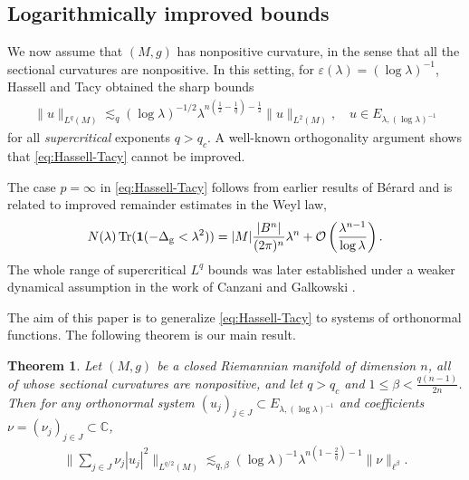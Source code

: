 \documentclass[12pt,reqno,a4paper]{amsart}
\let\coloneq\relax
\newcommand{\coloneq}{\coloneqq}
\newcommand{\C}{{\mathbb C}}
\newcommand{\g}{{\rm g}}
\newtheorem{theorem}{Theorem}[section]
\begin{document}
\subsection{Logarithmically improved bounds}
We now assume that $(M,g)$ has nonpositive curvature, in the sense that all the sectional curvatures are nonpositive. In this setting, for $\varepsilon(\lambda)=(\log \lambda)^{-1}$, Hassell and Tacy \cite{HassellTacy-2015} obtained the sharp bounds 
\begin{align}\label{eq:Hassell-Tacy}
  \|u\|_{L^{q}(M)} \lesssim_q (\log \lambda)^{-1/2} \lambda^{n(\frac{1}{2}-\frac{1}{q})-\frac{1}{2}}\|u\|_{L^2(M)},\quad u\in E_{\lambda, (\log \lambda)^{-1}}
\end{align}
for all \emph{supercritical} exponents $q>q_c$.  A well-known orthogonality argument shows that \eqref{eq:Hassell-Tacy} cannot be improved.

The case $p=\infty$ in \eqref{eq:Hassell-Tacy} follows from earlier results of B\'erard \cite{Berard-1977}
and is related to improved remainder estimates in the Weyl law,
\begin{align}\label{eq:weyl-law}
  N(\lambda)\coloneq\operatorname{Tr}(\mathbf{1}({-\Delta_\g }<\lambda^2))=|M|\frac{|B^n|}{(2\pi)^n}\lambda^{n}+\mathcal{O}\left(\frac{\lambda^{n-1}}{\log\lambda}\right).
\end{align}
The whole range of supercritical $L^q$ bounds was later established under a weaker dynamical assumption in the work of Canzani and Galkowski \cite{CanzaniGalkowski-2023-growth}.

The aim of this paper is to generalize \eqref{eq:Hassell-Tacy} to systems of orthonormal functions. The following theorem is our main result.


\begin{theorem}\label{thm:main}
  Let $(M,g)$ be a closed Riemannian manifold of dimension $n$, all of whose sectional curvatures are nonpositive, and let $q>q_c$ and $1\leq \beta<\frac{q(n-1)}{2n}$. Then for any orthonormal system $(u_j)_{j\in J}\subset E_{\lambda,(\log\lambda)^{-1}}$ and coefficients $\nu=(\nu_j)_{j\in J}\subset\C$,
  \begin{align}\label{ineq:main}
     \bigg\|\sum_{j\in J}\nu_j |u_j|^2\bigg\|_{L^{q/2}(M)}\lesssim_{q,\beta} (\log\lambda)^{-1} \lambda^{n(1-\frac{2}{q})-1} \|\nu\|_{\ell^{\beta}}.
  \end{align}
\end{theorem}
\end{document}
